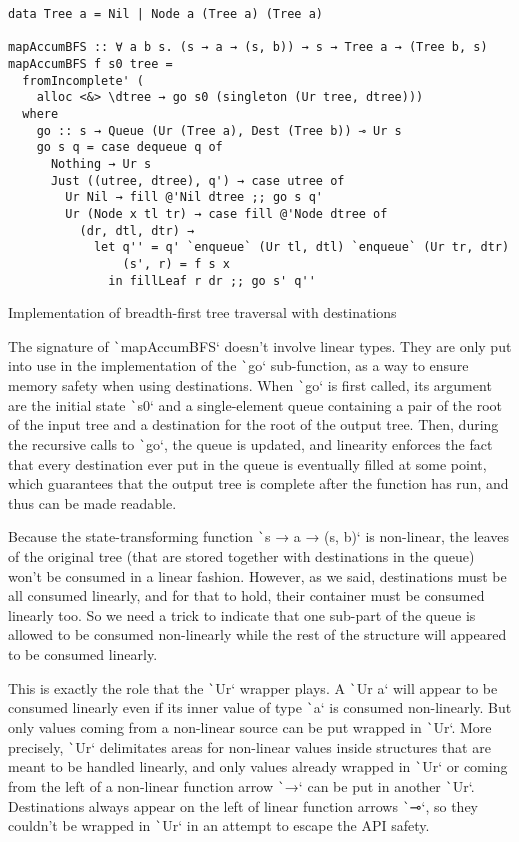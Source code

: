 \documentclass[english]{jflart}
\begin{document}
\begin{table}[t]
\small
\begin{verbatim}
data Tree a = Nil | Node a (Tree a) (Tree a)

mapAccumBFS :: ∀ a b s. (s → a → (s, b)) → s → Tree a → (Tree b, s)
mapAccumBFS f s0 tree =
  fromIncomplete' (
    alloc <&> \dtree → go s0 (singleton (Ur tree, dtree)))
  where
    go :: s → Queue (Ur (Tree a), Dest (Tree b)) ⊸ Ur s
    go s q = case dequeue q of
      Nothing → Ur s
      Just ((utree, dtree), q') → case utree of
        Ur Nil → fill @'Nil dtree ;; go s q'
        Ur (Node x tl tr) → case fill @'Node dtree of
          (dr, dtl, dtr) →
            let q'' = q' `enqueue` (Ur tl, dtl) `enqueue` (Ur tr, dtr)
                (s', r) = f s x
              in fillLeaf r dr ;; go s' q''
\end{verbatim}
\caption{Implementation of breadth-first tree traversal with destinations}
\label{table:impl-bfs-tree-traversal}
\end{table}

The signature of \texttt`mapAccumBFS` doesn't involve linear types. They are only put into use in the implementation of the \texttt`go` sub-function, as a way to ensure memory safety when using destinations. When \texttt`go` is first called, its argument are the initial state \texttt`s0` and a single-element queue containing a pair of the root of the input tree and a destination for the root of the output tree. Then, during the recursive calls to \texttt`go`, the queue is updated, and linearity enforces the fact that every destination ever put in the queue is eventually filled at some point, which guarantees that the output tree is complete after the function has run, and thus can be made readable.

Because the state-transforming function \texttt`s → a → (s, b)` is non-linear, the leaves of the original tree (that are stored together with destinations in the queue) won't be consumed in a linear fashion. However, as we said, destinations must be all consumed linearly, and for that to hold, their container must be consumed linearly too. So we need a trick to indicate that one sub-part of the queue is allowed to be consumed non-linearly while the rest of the structure will appeared to be consumed linearly.

This is exactly the role that the \texttt`Ur` wrapper plays. A \texttt`Ur a` will appear to be consumed linearly even if its inner value of type \texttt`a` is consumed non-linearly. But only values coming from a non-linear source can be put wrapped in \texttt`Ur`. More precisely, \texttt`Ur` delimitates areas for non-linear values inside structures that are meant to be handled linearly, and only values already wrapped in \texttt`Ur` or coming from the left of a non-linear function arrow \texttt`→` can be put in another \texttt`Ur`. Destinations always appear on the left of linear function arrows \texttt`⊸`, so they couldn't be wrapped in \texttt`Ur` in an attempt to escape the API safety.
\end{document}
